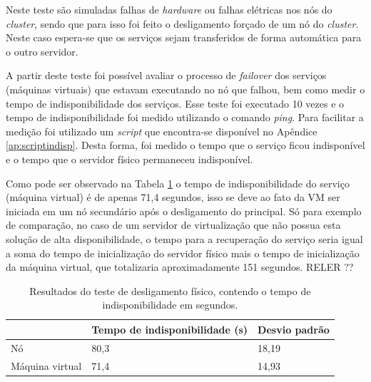 Neste teste são simuladas falhas de \textit{hardware} ou falhas elétricas nos nós do \textit{cluster}, sendo que para isso foi feito o desligamento 
forçado de um nó do \textit{cluster}. Neste caso espera-se que os serviços sejam transferidos de forma automática para o outro servidor. 

A partir deste teste foi possível avaliar o processo de \textit{failover} dos serviços (máquinas virtuais) que estavam executando no nó que falhou, 
bem como medir o tempo de indisponibilidade dos serviços. Esse teste foi executado 10 vezes e o tempo de indisponibilidade foi medido utilizando o 
comando \textit{ping}. Para facilitar a medição foi utilizado um \textit{script} que encontra-se disponível no Apêndice \ref{ap:scriptindisp}. 
Desta forma, foi medido o tempo que o serviço ficou indisponível e o tempo que o servidor físico permaneceu indisponível.

Como pode ser observado na Tabela \ref{tab:teste1resultados} o tempo de indisponibilidade do serviço (máquina virtual) é de apenas 71,4 segundos, 
isso se deve ao fato da \ac{VM} ser iniciada em um nó secundário após o desligamento do principal. Só para exemplo de comparação, no caso de um 
servidor de virtualização que não possua esta solução de alta disponibilidade, o tempo para a recuperação do serviço seria igual a soma do 
tempo de inicialização do servidor físico mais o tempo de inicialização da máquina virtual, que totalizaria aproximadamente 151 segundos. 
RELER ??



\begin{table}[h!]
\caption{Resultados do teste de desligamento físico, contendo o tempo de indisponibilidade em segundos.}
\small
\label{tab:teste1resultados}
\begin{center}
\begin{tabular}{|l|l|l|}\hline
 & \textbf{Tempo de indisponibilidade (s)} & \textbf{Desvio padrão} \\\hline
Nó & 80,3 & 18,19 \\\hline
Máquina virtual & 71,4 & 14,93 \\\hline
\end{tabular}
\end{center}
\end{table}

